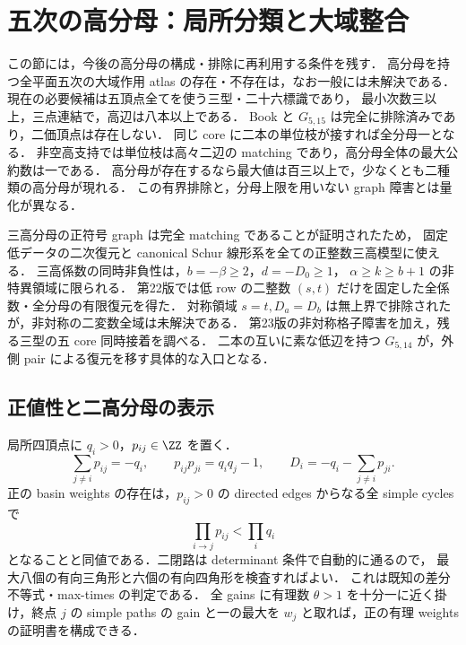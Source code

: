 \section{五次の高分母：局所分類と大域整合}
\label{nt19:denominators}

この節には，今後の高分母の構成・排除に再利用する条件を残す．
高分母を持つ全平面五次の大域作用 atlas の存在・不存在は，なお一般には未解決である．
現在の必要候補は五頂点全てを使う三型・二十六標識であり，
最小次数三以上，三点連結で，高辺は八本以上である．
Book と $G_{5,15}$ は完全に排除済みであり，二価頂点は存在しない．
同じ core に二本の単位枝が接すれば全分母一となる．
非空高支持では単位枝は高々二辺の matching であり，高分母全体の最大公約数は一である．
高分母が存在するなら最大値は百三以上で，少なくとも二種類の高分母が現れる．
この有界排除と，分母上限を用いない graph 障害とは量化が異なる．

三高分母の正符号 graph は完全 matching であることが証明されたため，
固定低データの二次復元と canonical Schur 線形系を全ての正整数三高模型に使える．
三高係数の同時非負性は，$b=-\beta\ge2$，$d=-D_0\ge1$，
$\alpha\ge k\ge b+1$ の非特異領域に限られる．
第22版では低 row の二整数 $(s,t)$ だけを固定した全係数・全分母の有限復元を得た．
対称領域 $s=t,D_a=D_b$ は無上界で排除されたが，非対称の二変数全域は未解決である．
第23版の非対称格子障害を加え，残る三型の五 core 同時接着を調べる．
二本の互いに素な低辺を持つ $G_{5,14}$ が，外側 pair による復元を移す具体的な入口となる．

\subsection{正値性と二高分母の表示}

局所四頂点に $q_i>0$，$p_{ij}\in\ZZ$ を置く．
\[
 \sum_{j\ne i}p_{ij}=-q_i,\qquad
 p_{ij}p_{ji}=q_iq_j-1,\qquad
 D_i=-q_i-\sum_{j\ne i}p_{ji}.
\]
正の basin weights の存在は，$p_{ij}>0$ の directed edges からなる全 simple cycles で
\[
 \prod_{i\to j}p_{ij}<\prod_iq_i
\]
となることと同値である．二閉路は determinant 条件で自動的に通るので，
最大八個の有向三角形と六個の有向四角形を検査すればよい．
これは既知の差分不等式・max-times の判定\cite[\S2]{SergeevSchneiderButkovic}である．
全 gains に有理数 $\theta>1$ を十分一に近く掛け，終点 $j$ の simple paths の gain と一の最大を
$w_j$ と取れば，正の有理 weights の証明書を構成できる．

